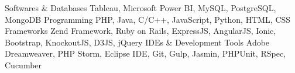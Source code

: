 \begin{cvskills}
  \cvskill
	{Softwares \& Databases}
	{Tableau, Microsoft Power BI, MySQL, PostgreSQL, MongoDB}   
  \cvskill
    {Programming}
    {PHP, Java, C/C++, JavaScript, Python, HTML, CSS}
  \cvskill
  {Frameworks}
  {Zend Framework, Ruby on Rails, ExpressJS, AngularJS, Ionic, Bootstrap, KnockoutJS, D3JS, jQuery}  
  \cvskill
  {IDEs \& Development Tools}
  {Adobe Dreamweaver, PHP Storm, Eclipse IDE, Git, Gulp, Jasmin, PHPUnit, RSpec, Cucumber}  
    
\end{cvskills}
